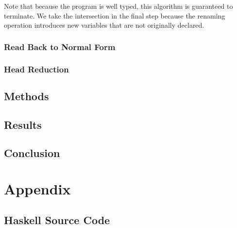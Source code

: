 \documentclass{article}
\theoremstyle{remark}
\begin{document}
Note that because the program is well typed, this algorithm is guaranteed to terminate. We take the intersection in the final step because the renaming operation introduces new variables that are not originally declared.

\subsubsection{Read Back to Normal Form}

\subsubsection{Head Reduction} \label{sec:head-red}

\subsection{Methods}

\subsection{Results}

\subsection{Conclusion}


\clearpage




\appendix
\section{Appendix} 
\subsection{Haskell Source Code} \label{apdix:source-code}
\end{document}
